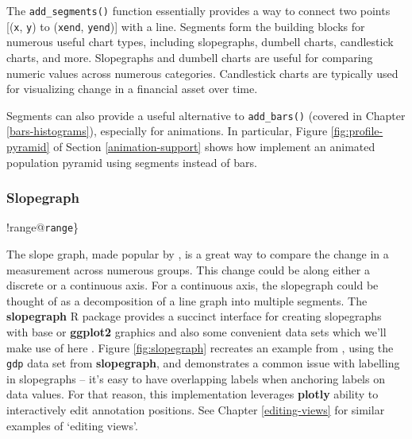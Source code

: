 \documentclass[
  12pt,
]{krantz}
\begin{document}
The \texttt{add\_segments()} function essentially provides a way to connect two points {[}(\texttt{x}, \texttt{y}) to (\texttt{xend}, \texttt{yend}){]} with a line. Segments form the building blocks for numerous useful chart types, including slopegraphs, dumbell charts, candlestick charts, and more. Slopegraphs and dumbell charts are useful for comparing numeric values across numerous categories. Candlestick charts are typically used for visualizing change in a financial asset over time.

Segments can also provide a useful alternative to \texttt{add\_bars()} (covered in Chapter \ref{bars-histograms}), especially for animations. In particular, Figure \ref{fig:profile-pyramid} of Section \ref{animation-support} shows how implement an animated population pyramid using segments instead of bars.

\hypertarget{slopegraph}{%
\subsubsection{Slopegraph}\label{slopegraph}}

!range@\texttt{range}\}


The slope graph, made popular by \citet{tufte2001}, is a great way to compare the change in a measurement across numerous groups. This change could be along either a discrete or a continuous axis. For a continuous axis, the slopegraph could be thought of as a decomposition of a line graph into multiple segments. The \textbf{slopegraph} R package provides a succinct interface for creating slopegraphs with base or \textbf{ggplot2} graphics and also some convenient data sets which we'll make use of here \citep{slopegraph}. Figure \ref{fig:slopegraph} recreates an example from \citet{tufte2001}, using the \texttt{gdp} data set from \textbf{slopegraph}, and demonstrates a common issue with labelling in slopegraphs -- it's easy to have overlapping labels when anchoring labels on data values. For that reason, this implementation leverages \textbf{plotly} ability to interactively edit annotation positions. See Chapter \ref{editing-views} for similar examples of `editing views'.
\end{document}
